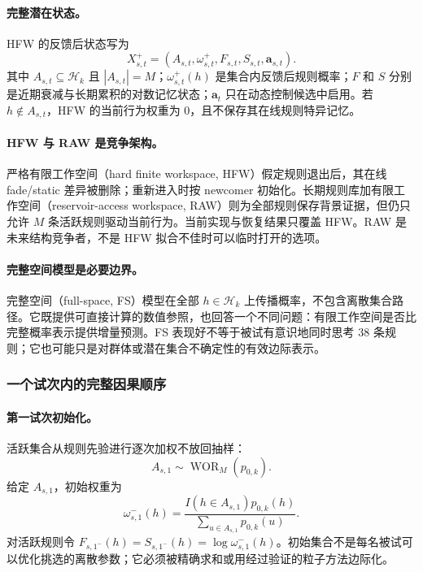 \paragraph{完整潜在状态。}
HFW 的反馈后状态写为
\begin{equation}
    X^+_{s,t}
    =\left(A_{s,t},\omega^+_{s,t},F_{s,t},S_{s,t},\mathbf a_{s,t}\right).
    \label{eq:model0805-latent-state}
\end{equation}
其中 $A_{s,t}\subseteq\mathcal H_k$ 且 $|A_{s,t}|=M$；$\omega^+_{s,t}(h)$ 是集合内反馈后规则概率；$F$ 和 $S$ 分别是近期衰减与长期累积的对数记忆状态；$\mathbf a_t$ 只在动态控制候选中启用。若 $h\notin A_{s,t}$，HFW 的当前行为权重为 0，且不保存其在线规则特异记忆。

\paragraph{HFW 与 RAW 是竞争架构。}
严格有限工作空间（hard finite workspace, HFW）假定规则退出后，其在线 fade/static 差异被删除；重新进入时按 newcomer 初始化。长期规则库加有限工作空间（reservoir-access workspace, RAW）则为全部规则保存背景证据，但仍只允许 $M$ 条活跃规则驱动当前行为。当前实现与恢复结果只覆盖 HFW。RAW 是未来结构竞争者，不是 HFW 拟合不佳时可以临时打开的选项。

\paragraph{完整空间模型是必要边界。}
完整空间（full-space, FS）模型在全部 $h\in\mathcal H_k$ 上传播概率，不包含离散集合路径。它既提供可直接计算的数值参照，也回答一个不同问题：有限工作空间是否比完整概率表示提供增量预测。FS 表现好不等于被试有意识地同时思考 38 条规则；它也可能只是对群体或潜在集合不确定性的有效边际表示。


\subsubsection{一个试次内的完整因果顺序}

\paragraph{第一试次初始化。}
活跃集合从规则先验进行逐次加权不放回抽样：
\begin{equation}
    A_{s,1}\sim\operatorname{WOR}_M(p_{0,k}).
    \label{eq:model0805-initial-set}
\end{equation}
给定 $A_{s,1}$，初始权重为
\begin{equation}
    \omega^-_{s,1}(h)
    =\frac{I(h\in A_{s,1})p_{0,k}(h)}
    {\sum_{u\in A_{s,1}}p_{0,k}(u)}.
    \label{eq:model0805-initial-weight}
\end{equation}
对活跃规则令 $F_{s,1^-}(h)=S_{s,1^-}(h)=\log\omega^-_{s,1}(h)$。初始集合不是每名被试可以优化挑选的离散参数；它必须被精确求和或用经过验证的粒子方法边际化。

